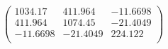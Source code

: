 \documentclass{article}
\begin{document}
\[\left(
\begin{array}{ccc}
 1034.17 & 411.964 & -11.6698 \\
 411.964 & 1074.45 & -21.4049 \\
 -11.6698 & -21.4049 & 224.122 \\
\end{array}
\right)\]
\end{document}
